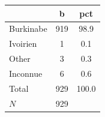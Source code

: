 {
\def\sym#1{\ifmmode^{#1}\else\(^{#1}\)\fi}
\begin{tabular}{l*{1}{cc}}
\toprule
            &           b&         pct\\
\midrule
Burkinabe   &         919&        98.9\\
Ivoirien    &           1&         0.1\\
Other       &           3&         0.3\\
Inconnue    &           6&         0.6\\
Total       &         929&       100.0\\
\midrule
\(N\)       &         929&            \\
\bottomrule
\end{tabular}
}
